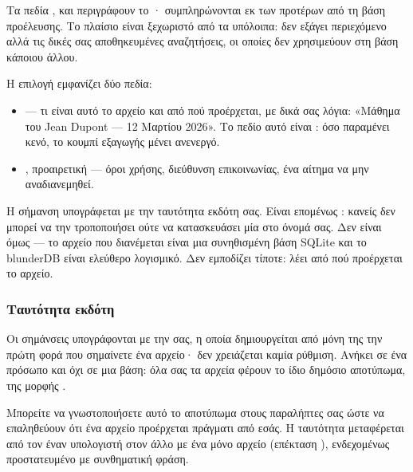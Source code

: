 \documentclass[letterpaper,10pt,greek]{sphinxmanual}
\begin{document}
\sphinxAtStartPar
Τα πεδία ,  και  περιγράφουν το · συμπληρώνονται εκ των προτέρων από τη βάση προέλευσης. Το πλαίσιο  είναι ξεχωριστό από τα υπόλοιπα: δεν εξάγει περιεχόμενο αλλά τις δικές σας αποθηκευμένες αναζητήσεις, οι οποίες δεν χρησιμεύουν στη βάση κάποιου άλλου.

\sphinxAtStartPar
Η επιλογή  εμφανίζει δύο πεδία:
\begin{itemize}
\item {} 
\sphinxAtStartPar
{} — τι είναι αυτό το αρχείο και από πού προέρχεται, με δικά σας λόγια: «Μάθημα του Jean Dupont — 12 Μαρτίου 2026». Το πεδίο αυτό είναι : όσο παραμένει κενό, το κουμπί εξαγωγής μένει ανενεργό.

\item {} 
\sphinxAtStartPar
{}, προαιρετική — όροι χρήσης, διεύθυνση επικοινωνίας, ένα αίτημα να μην αναδιανεμηθεί.

\end{itemize}

\sphinxAtStartPar
Η σήμανση υπογράφεται με την ταυτότητα εκδότη σας. Είναι επομένως : κανείς δεν μπορεί να την τροποποιήσει ούτε να κατασκευάσει μία στο όνομά σας. Δεν είναι όμως  — το αρχείο που διανέμεται είναι μια συνηθισμένη βάση SQLite και το blunderDB είναι ελεύθερο λογισμικό. Δεν εμποδίζει τίποτε: λέει από πού προέρχεται το αρχείο.


\subsubsection{Ταυτότητα εκδότη}
\label{\detokenize{manuel:identite-d-emetteur}}
\sphinxAtStartPar
Οι σημάνσεις υπογράφονται με την  σας, η οποία δημιουργείται από μόνη της την πρώτη φορά που σημαίνετε ένα αρχείο· δεν χρειάζεται καμία ρύθμιση. Ανήκει σε ένα πρόσωπο και όχι σε μια βάση: όλα σας τα αρχεία φέρουν το ίδιο δημόσιο αποτύπωμα, της μορφής .

\sphinxAtStartPar
Μπορείτε να γνωστοποιήσετε αυτό το αποτύπωμα στους παραλήπτες σας ώστε να επαληθεύουν ότι ένα αρχείο προέρχεται πράγματι από εσάς. Η ταυτότητα μεταφέρεται από τον έναν υπολογιστή στον άλλο με ένα μόνο αρχείο (επέκταση ), ενδεχομένως προστατευμένο με συνθηματική φράση. 
\end{document}
